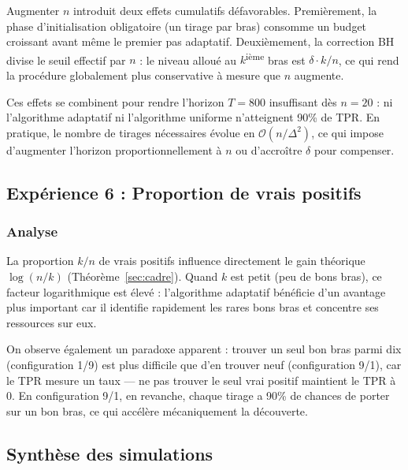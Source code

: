 \documentclass[11pt,a4paper]{article}
\begin{document}
Augmenter $n$ introduit deux effets cumulatifs défavorables.
Premièrement, la phase d'initialisation obligatoire (un tirage par
bras) consomme un budget croissant avant même le premier pas adaptatif.
Deuxièmement, la correction BH divise le seuil effectif par $n$ :
le niveau alloué au $k$\textsuperscript{ième} bras est
$\delta \cdot k/n$, ce qui rend la procédure globalement plus
conservative à mesure que $n$ augmente.

Ces effets se combinent pour rendre l'horizon $T = 800$ insuffisant
dès $n = 20$ : ni l'algorithme adaptatif ni l'algorithme uniforme
n'atteignent 90\% de TPR. En pratique, le nombre de tirages nécessaires
évolue en $\mathcal{O}(n / \Delta^2)$, ce qui impose d'augmenter
l'horizon proportionnellement à $n$ ou d'accroître $\delta$ pour
compenser.

\subsection{Expérience 6 : Proportion de vrais positifs}

\subsubsection{Analyse}

La proportion $k/n$ de vrais positifs influence directement le gain
théorique $\log(n/k)$ (Théorème~\ref{sec:cadre}). Quand $k$ est petit
(peu de bons bras), ce facteur logarithmique est élevé : l'algorithme
adaptatif bénéficie d'un avantage plus important car il identifie
rapidement les rares bons bras et concentre ses ressources sur eux.

On observe également un paradoxe apparent : trouver un seul bon bras
parmi dix (configuration 1/9) est plus difficile que d'en trouver neuf
(configuration 9/1), car le TPR mesure un taux — ne pas trouver le
seul vrai positif maintient le TPR à 0. En configuration 9/1, en
revanche, chaque tirage a 90\% de chances de porter sur un bon bras,
ce qui accélère mécaniquement la découverte.

\subsection{Synthèse des simulations}
\end{document}
